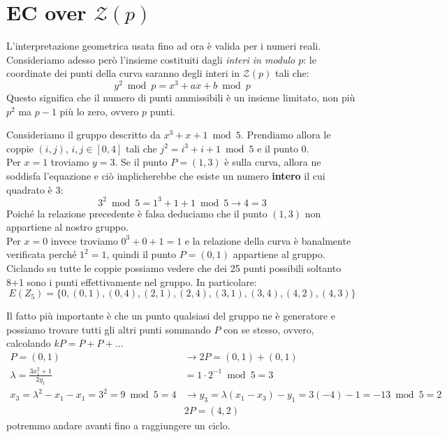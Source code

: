 \section{EC over $\mathcal{Z}(p)$}
L'interpretazione geometrica usata fino ad ora è valida per i numeri reali. Consideriamo adesso però l'insieme costituiti dagli \textit{interi in modulo $p$}: le coordinate dei punti della curva saranno degli interi in $\mathcal{Z}(p)$ tali che:
\begin{equation}\label{eq:validecc}
    y^2\bmod{p}=x^3+ax+b\bmod{p}
\end{equation}
Questo significa che il numero di punti ammissibili è un insieme limitato, non più $p^2$ ma $p-1$ più lo zero, ovvero $p$ punti.
\begin{example} Consideriamo il gruppo descritto da $x^3+x+1\bmod5$. Prendiamo allora le coppie $(i,j),\,i,j\in[0,4]$ tali che $j^2=i^3+i+1\bmod5$ e il punto 0.\\
Per $x=1$ troviamo $y=3$. Se il punto $P=(1,3)$ è sulla curva, allora ne soddisfa l'equazione e ciò implicherebbe che esiste un numero \textbf{intero} il cui quadrato è 3: 
\[3^2\bmod5=1^3+1+1\bmod5\longrightarrow4=3\]
Poiché la relazione precedente è falsa deduciamo che il punto $(1,3)$ non appartiene al nostro gruppo.\\
Per $x=0$ invece troviamo $0^3+0+1=1$ e la relazione della curva è banalmente verificata perché $1^2=1$, quindi il punto $P=(0,1)$ appartiene al gruppo.\\
Ciclando su tutte le coppie possiamo vedere che dei 25 punti possibili soltanto 8+1 sono i punti effettivamente nel gruppo. In particolare:
\[E(Z_5)=\{0,(0,1),(0,4),(2,1),(2,4),(3,1),(3,4),(4,2),(4,3)\}\]
\begin{note}
Il fatto più importante è che un punto qualsiasi del gruppo ne è generatore e possiamo trovare tutti gli altri punti sommando $P$ con se stesso, ovvero, calcolando $kP=P+P+\dots$
\begin{equation*}
    \begin{aligned}
    P=(0,1)&\longrightarrow2P=(0,1)+(0,1)\\
    \lambda=\frac{3x_1^2+1}{2y_1}&=1\cdot2^{-1}\bmod5=3\\
    x_3=\lambda^2-x_1-x_1=3^2=9\bmod5=4&\longrightarrow y_3=\lambda(x_1-x_3)-y_1=3(-4)-1=-13\bmod5=2\\
    &2P=(4,2)
    \end{aligned}
\end{equation*}
potremmo andare avanti fino a raggiungere un ciclo.
\end{note}
\end{example}
